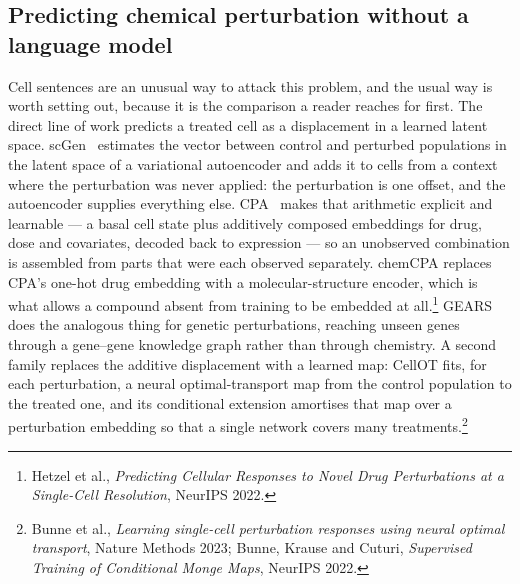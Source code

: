 \subsection{Predicting chemical perturbation without a language model}
\label{sec:lit-chem}

Cell sentences are an unusual way to attack this problem, and the usual way is worth setting out,
because it is the comparison a reader reaches for first. The direct line of work predicts a treated
cell as a displacement in a learned latent space. scGen~\cite{scgen} estimates the vector between
control and perturbed populations in the latent space of a variational autoencoder and adds it to
cells from a context where the perturbation was never applied: the perturbation is one offset, and
the autoencoder supplies everything else. CPA~\cite{cpa} makes that arithmetic explicit and
learnable --- a basal cell state plus additively composed embeddings for drug, dose and covariates,
decoded back to expression --- so an unobserved combination is assembled from parts that were each
observed separately. chemCPA replaces CPA's one-hot drug embedding with a molecular-structure
encoder, which is what allows a compound absent from training to be embedded at
all.\footnote{Hetzel et al., \emph{Predicting Cellular Responses to Novel Drug Perturbations at a
Single-Cell Resolution}, NeurIPS 2022.} GEARS~\cite{gears} does the analogous thing for genetic
perturbations, reaching unseen genes through a gene--gene knowledge graph rather than through
chemistry. A second family replaces the additive displacement with a learned map: CellOT fits, for
each perturbation, a neural optimal-transport map from the control population to the treated one,
and its conditional extension amortises that map over a perturbation embedding so that a single
network covers many treatments.\footnote{Bunne et al., \emph{Learning single-cell perturbation
responses using neural optimal transport}, Nature Methods 2023; Bunne, Krause and Cuturi,
\emph{Supervised Training of Conditional Monge Maps}, NeurIPS 2022.}

